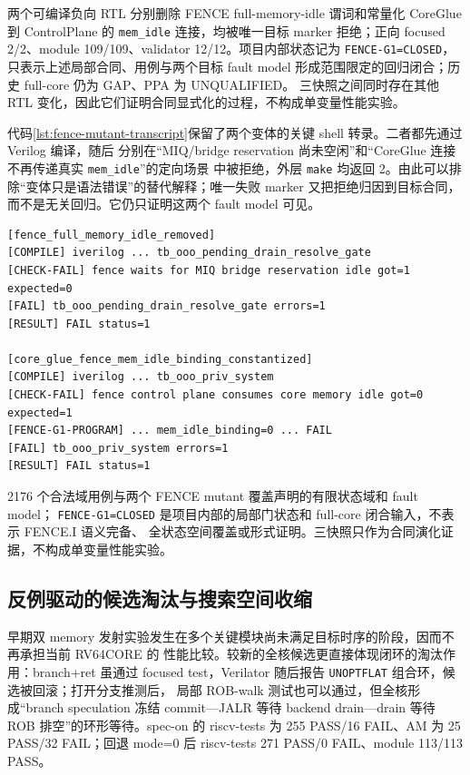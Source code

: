 \documentclass[UTF8,a4paper,zihao=-4,oneside]{ctexart}
\begin{document}
两个可编译负向 RTL 分别删除 FENCE full-memory-idle 谓词和常量化 CoreGlue 到 ControlPlane 的
\texttt{mem\_idle} 连接，均被唯一目标 marker 拒绝；正向 focused 2/2、module 109/109、validator
12/12。项目内部状态记为 \texttt{FENCE-G1=CLOSED}，只表示上述局部合同、用例与两个目标 fault model
形成范围限定的回归闭合；历史 full-core 仍为 GAP、PPA 为 UNQUALIFIED。
三快照之间同时存在其他 RTL 变化，因此它们证明合同显式化的过程，不构成单变量性能实验。

代码\ref{lst:fence-mutant-transcript}保留了两个变体的关键 shell 转录。二者都先通过 Verilog 编译，随后
分别在“MIQ/bridge reservation 尚未空闲”和“CoreGlue 连接不再传递真实 \texttt{mem\_idle}”的定向场景
中被拒绝，外层 \texttt{make} 均返回 2。由此可以排除“变体只是语法错误”的替代解释；唯一失败 marker
又把拒绝归因到目标合同，而不是无关回归。它仍只证明这两个 fault model 可见。

\begin{lstlisting}[language={},numbers=none,float=htbp,
  caption={两个编译成功的 FENCE 负向 RTL 及其动态拒绝记录（删节）},
  label={lst:fence-mutant-transcript}]
[fence_full_memory_idle_removed]
[COMPILE] iverilog ... tb_ooo_pending_drain_resolve_gate
[CHECK-FAIL] fence waits for MIQ bridge reservation idle got=1 expected=0
[FAIL] tb_ooo_pending_drain_resolve_gate errors=1
[RESULT] FAIL status=1

[core_glue_fence_mem_idle_binding_constantized]
[COMPILE] iverilog ... tb_ooo_priv_system
[CHECK-FAIL] fence control plane consumes core memory idle got=0 expected=1
[FENCE-G1-PROGRAM] ... mem_idle_binding=0 ... FAIL
[FAIL] tb_ooo_priv_system errors=1
[RESULT] FAIL status=1
\end{lstlisting}

2176 个合法域用例与两个 FENCE mutant 覆盖声明的有限状态域和 fault model；
\texttt{FENCE-G1=CLOSED} 是项目内部的局部门状态和 full-core 闭合输入，不表示 FENCE.I 语义完备、
全状态空间覆盖或形式证明。三快照只作为合同演化证据，不构成单变量性能实验。

\subsection{反例驱动的候选淘汰与搜索空间收缩}

早期双 memory 发射实验发生在多个关键模块尚未满足目标时序的阶段，因而不再承担当前 RV64CORE 的
性能比较。较新的全核候选更直接体现闭环的淘汰作用：branch+ret
虽通过 focused test，Verilator 随后报告 \texttt{UNOPTFLAT} 组合环，候选被回滚；打开分支推测后，
局部 ROB-walk 测试也可以通过，但全核形成“branch speculation 冻结 commit---JALR 等待 backend
drain---drain 等待 ROB 排空”的环形等待。spec-on 的 riscv-tests 为 255 PASS/16 FAIL、AM 为
25 PASS/32 FAIL；回退 mode=0 后 riscv-tests 271 PASS/0 FAIL、module 113/113 PASS。
\end{document}
